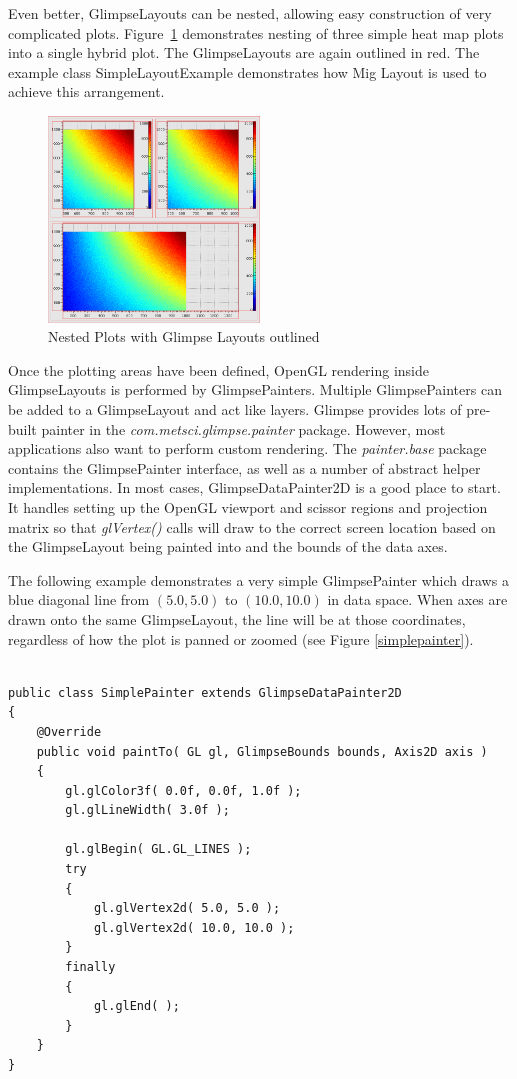 \documentclass[12pt]{article}
\begin{document}
Even better, GlimpseLayouts can be nested, allowing easy construction of very complicated plots. Figure~\ref{multiplotoutlines} demonstrates nesting of three simple heat map plots into a single hybrid plot. The GlimpseLayouts are again outlined in red. The example class SimpleLayoutExample demonstrates how Mig Layout is used to achieve this arrangement.

\begin{figure}
  \centering
    \includegraphics[width=0.5\textwidth]{images/Multi_Heatmap_red_layout.png}
  \caption{Nested Plots with Glimpse Layouts outlined}
\label{multiplotoutlines}
\end{figure}

Once the plotting areas have been defined, OpenGL rendering inside GlimpseLayouts is performed by GlimpsePainters. Multiple GlimpsePainters can be added to a GlimpseLayout and act like layers. Glimpse provides lots of pre-built painter in the \emph{com.metsci.glimpse.painter} package. However, most applications also want to perform custom rendering. The \emph{painter.base} package contains the GlimpsePainter interface, as well as a number of abstract helper implementations. In most cases, GlimpseDataPainter2D is a good place to start. It handles setting up the OpenGL viewport and scissor regions and projection matrix so that \emph{glVertex()} calls will draw to the correct screen location based on the GlimpseLayout being painted into and the bounds of the data axes.

The following example demonstrates a very simple GlimpsePainter which draws a blue diagonal line from \((5.0,5.0)\) to \((10.0,10.0)\) in data space. When axes are drawn onto the same GlimpseLayout, the line will be at those coordinates, regardless of how the plot is panned or zoomed (see Figure \ref{simplepainter}).

\begin{samepage}
\begin{verbatim}

public class SimplePainter extends GlimpseDataPainter2D
{
    @Override
    public void paintTo( GL gl, GlimpseBounds bounds, Axis2D axis )
    {
        gl.glColor3f( 0.0f, 0.0f, 1.0f );
        gl.glLineWidth( 3.0f );
        
        gl.glBegin( GL.GL_LINES );
        try
        {
            gl.glVertex2d( 5.0, 5.0 );
            gl.glVertex2d( 10.0, 10.0 );
        }
        finally
        {
            gl.glEnd( );
        }
    }
}

\end{verbatim}
\end{samepage}
\end{document}

